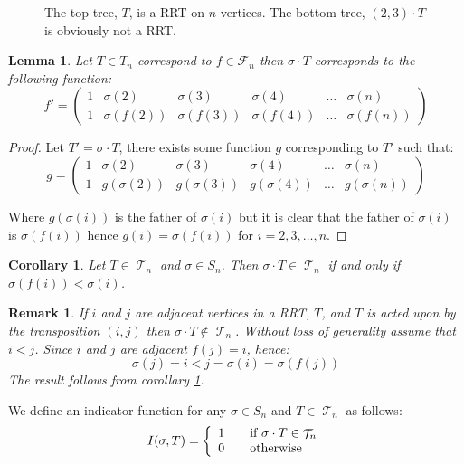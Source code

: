 \documentclass[10pt]{amsart} %
\newtheorem{remk}{Remark}
\newtheorem{corol}{Corollary}
\newtheorem{lem}[thm]{Lemma}
\theoremstyle{definition}
\DeclareMathOperator{\T}{\mathcal{T}}
\begin{document}
\begin{figure}[H]
\begin{tikzpicture}[y=0.80pt,x=0.80pt,yscale=-1, inner sep=0pt, outer sep=0pt, scale = 0.35]
\end{tikzpicture}
\caption{The top tree, $T$, is a RRT on $n$ vertices. The bottom tree, $(2,3) \cdot T$ is obviously not a RRT.}\label{fig:1}
\end{figure}


\begin{lem}
Let $T \in T_n$ correspond to $f \in \mathcal{F}_n$ then $\sigma \cdot T$ corresponds to the following  function:
\[ f'= \left(\begin{array}{cccccc}
     1& \sigma(2)&\sigma(3) &\sigma(4)& \dots & \sigma(n) \\
     1 & \sigma(f(2)) &\sigma(f(3)) &\sigma(f(4)) &\dots & \sigma(f(n))
    \end{array} \right)
\]
\end{lem}

\begin{proof}
 Let $T' = \sigma \cdot T$, there exists some function $g$ corresponding to $T'$ such that:
 \[ g= \left(\begin{array}{cccccc}
     1& \sigma(2)&\sigma(3) &\sigma(4)& \dots & \sigma(n) \\
     1 & g(\sigma(2)) &g(\sigma(3)) &g(\sigma(4)) &\dots & g(\sigma(n))
    \end{array} \right)
\]

Where $g(\sigma(i))$ is the father of $\sigma(i)$ but it is clear that the father of $\sigma(i)$ is $\sigma(f(i))$  hence $g(i) = \sigma(f(i))$ for $i = 2,3,\dots,n$.  
\end{proof}

\begin{corol}\label{cor:sig}
Let $T \in \T_n$ and $ \sigma \in S_n$.  Then  $\sigma  \cdot T \in \T_n$ if and only if $\sigma(f(i)) < \sigma(i) $. 
\end{corol}

\begin{remk}\label{remk:a} If $i$ and $j$ are adjacent vertices in a RRT, $T$, and $T$ is acted upon by the transposition $(i,j)$ then
 $\sigma \cdot T \notin \T_n$.  Without loss of generality assume that $i <j $.  Since $i$ and $j$ are adjacent $f(j) = i$, hence:
\[ \sigma(j) = i  < j = \sigma(i) =  \sigma(f(j))\]
The result follows from corollary \ref{cor:sig}. 
\end{remk}

We define an indicator function for any $\sigma \in S_n$  and $ T \in \T_n$ as follows:
 \[ I(\sigma,T) = \left\{
  \begin{array}{l l}
    1 & \quad \text{if $\sigma \cdot T \in \T_n$}\\
    0 & \quad \text{otherwise}
  \end{array} \right.\]
\end{document}
